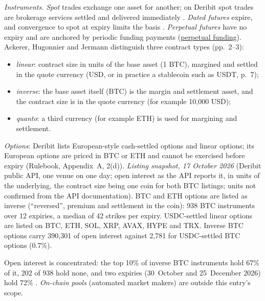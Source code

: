 \begin{qfdefinition}
\emph{Instruments.} \emph{Spot} trades exchange one asset for another; on Deribit spot trades are brokerage services settled and delivered immediately \citep[Rulebook v2.0, Rules 1.2(a) and 11.3(a)]{gapclose-deribit-rules}. \emph{Dated futures} expire, and convergence to spot at expiry limits the basis \citep[arXiv v2, p.~2]{roadmap-perpetual-pricing}. \emph{Perpetual futures} have no expiry and are anchored by periodic funding payments (\hyperref[mech:perpetual-funding]{perpetual funding}). Ackerer, Hugonnier and Jermann distinguish three contract types (pp.~2--3):
\begin{itemize}
\item \emph{linear}: contract size in units of the base asset (1 BTC), margined and settled in the quote currency (USD, or in practice a stablecoin such as USDT, p.~7);
\item \emph{inverse}: the base asset itself (BTC) is the margin and settlement asset, and the contract size is in the quote currency (for example 10{,}000 USD);
\item \emph{quanto}: a third currency (for example ETH) is used for margining and settlement.
\end{itemize}
\emph{Options}: Deribit lists European-style cash-settled options and linear options; its European options are priced in BTC or ETH and cannot be exercised before expiry (Rulebook, Appendix~A, 2(d)). \emph{Listing snapshot, 17 October 2026} (Deribit public API, one venue on one day; open interest as the API reports it, in units of the underlying, the contract size being one coin for both BTC listings; units not confirmed from the API documentation). BTC and ETH options are listed as inverse (``reversed'', premium and settlement in the coin): 938 BTC instruments over 12 expiries, a median of 42 strikes per expiry. USDC-settled linear options are listed on BTC, ETH, SOL, XRP, AVAX, HYPE and TRX. Inverse BTC options carry 390{,}301 of open interest against 2{,}781 for USDC-settled BTC options (0.7\%).

Open interest is concentrated: the top 10\% of inverse BTC instruments hold 67\% of it, 202 of 938 hold none, and two expiries (30~October and 25~December 2026) hold 72\% \citep[\nolinkurl{get_instruments} and \nolinkurl{get_book_summary_by_currency}, 17 October 2026]{deribit-api-2026}. \emph{On-chain pools} (automated market makers) are outside this entry's scope.


\end{qfdefinition}
